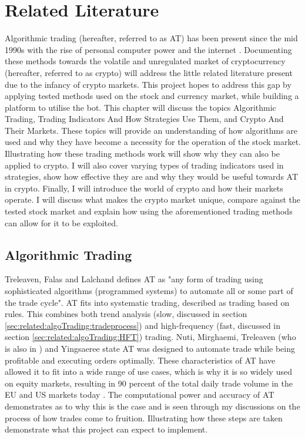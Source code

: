 %
\chapter{Related Literature}
\label{sec:related}
Algorithmic trading (hereafter, referred to as AT) has been present since the mid 1990s with the rise of personal computer power and the internet \cite{WEB:PISANI:2010}. Documenting these methods towards the volatile and unregulated market of cryptocurrency (hereafter, referred to as crypto) will address the little related literature present due to the infancy of crypto markets. This project hopes to address this gap by applying tested methods used on the stock and currency market, while building a platform to utilise the bot. This chapter will discuss the topics Algorithmic Trading, Trading Indicators And How Strategies Use Them, and Crypto And Their Markets. These topics will provide an understanding of how algorithms are used and why they have become a necessity for the operation of the stock market. Illustrating how these trading methods work will show why they can also be applied to crypto. I will also cover varying types of trading indicators used in strategies, show how effective they are and why they would be useful towards AT in crypto. Finally, I will introduce the world of crypto and how their markets operate. I will discuss what makes the crypto market unique, compare against the tested stock market and explain how using the aforementioned trading methods can allow for it to be exploited. 


\section{Algorithmic Trading}
\label{sec:related:algoTrading}
\noindent Treleaven, Falas and Lalchand \cite{ART:Treleaven:2013} defines AT as "any form of trading using sophisticated algorithms (programmed systems) to automate all or some part of the trade cycle". AT fits into systematic trading, described as trading based on rules. This combines both trend analysis (slow, discussed in section \ref{sec:related:algoTrading:tradeprocess}) and high-frequency (fast, discussed in section \ref{sec:related:algoTrading:HFT}) trading. Nuti, Mirghaemi, Treleaven (who is also in \cite{ART:Treleaven:2013}) and Yingsaeree \cite{ART:Nuti:2011} state AT was designed to automate trade while being profitable and executing orders optimally. These characteristics of AT have allowed it to fit into a wide range of use cases, which is why it is so widely used on equity markets, resulting in 90 percent of the total daily trade volume in the EU and US markets today \cite{WEB:Cheng:2017,ART:Kolakowski:2018}. The computational power and accuracy of AT demonstrates as to why this is the case and is seen through my discussions on the process of how trades come to fruition. Illustrating how these steps are taken demonstrate what this project can expect to implement.

